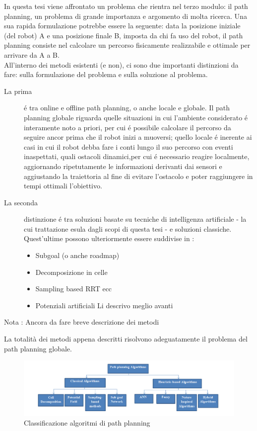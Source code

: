 \documentclass[14pt,twoside,a4paper]{extarticle}
\begin{document}
In questa tesi viene affrontato un problema che rientra nel terzo modulo: il path planning, un problema di grande importanza e argomento di molta ricerca. Una sua rapida formulazione potrebbe essere la seguente: data la posizione iniziale (del robot) A e una posizione finale B, imposta da chi fa uso del robot, il path planning consiste nel calcolare un percorso fisicamente realizzabile e ottimale per arrivare da A a B.\\ 
All'interno dei metodi esistenti (e non), ci sono due importanti distinzioni da fare: sulla formulazione del problema e sulla soluzione al problema.
\begin{description}
\item[La prima] é tra online e offline path planning, o anche locale e globale. Il path planning globale riguarda quelle situazioni in cui l'ambiente considerato é interamente noto a priori, per cui é possibile calcolare il percorso da seguire ancor prima che il robot inizi a muoversi; quello locale é inerente ai casi in cui il robot debba fare i conti lungo il suo percorso con eventi inaspettati, quali ostacoli dinamici,per cui é necessario reagire localmente, aggiornando ripetutamente le informazioni derivanti dai sensori e aggiustando la traiettoria al fine di evitare l'ostacolo e poter raggiungere in tempi ottimali l'obiettivo.
\item[La seconda] distinzione é tra soluzioni basate su tecniche di intelligenza artificiale - la cui trattazione esula dagli scopi di questa tesi - e soluzioni classiche. Quest'ultime possono ulteriormente essere suddivise in \cite{siciliano}:
\begin{itemize}
\item{Subgoal (o anche roadmap)}\\ 

\item{Decomposizione in celle}
\item{Sampling based} RRT ecc
\item{Potenziali artificiali} Li descrivo meglio avanti
\end{itemize}
\end{description}

Nota : Ancora da fare breve descrizione dei metodi

La totalità dei metodi appena descritti risolvono adeguatamente il problema del path planning globale.\cite{dalfonso} 

\begin{figure}[H]
\caption{Classificazione algoritmi di path planning\cite{mac2016}}
\includegraphics[width=\textwidth]{algoritmiPP.png}
\end{figure}
\end{document}
